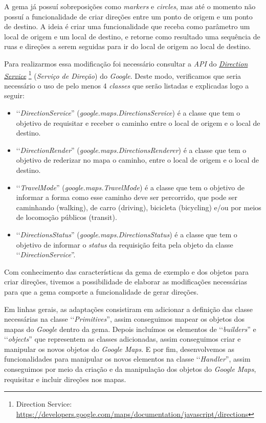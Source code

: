 A gema já possuí sobreposições como \emph{markers} e \emph{circles}, mas até o momento não possuí a
funcionalidade de criar direções entre um ponto de origem e um ponto de destino. A ideia é criar
uma funcionalidade que receba como parâmetro um local de origem e um local de destino, e retorne como
resultado uma sequência de ruas e direções a serem seguidas para ir do local de origem ao local de destino.

Para realizarmos essa modificação foi necessário consultar a \emph{API} do
\emph{\href{https://developers.google.com/maps/documentation/javascript/directions}{Direction Service}}
\footnote{Direction Service: \url{https://developers.google.com/maps/documentation/javascript/directions}}
(\emph{Serviço de Direção}) do \emph{Google}. Deste modo, verificamos que seria necessário o uso de pelo
menos 4 \emph{classes} que serão listadas e explicadas logo a seguir:

\begin{itemize}

 \item ‘‘\emph{DirectionService}'' (\emph{google.maps.DirectionsService}) é a classe que tem o
 objetivo de requisitar e receber o caminho entre o local de origem e o local de destino.

 \item ‘‘\emph{DirectionRender}'' (\emph{google.maps.DirectionsRenderer}) é a classe que tem o
 objetivo de rederizar no mapa o caminho, entre o local de origem e o local de destino.

 \item ‘‘\emph{TravelMode}'' (\emph{google.maps.TravelMode}) é a classe que tem o objetivo de
 informar a forma como esse caminho deve ser percorrido, que pode ser caminhando (walking), de carro
 (driving), bicicleta (bicycling) e/ou por meios de locomoção públicos (transit).

 \item ‘‘\emph{DirectionsStatus}'' (\emph{google.maps.DirectionsStatus}) é a classe que tem o
 objetivo de informar o \emph{status} da requisição feita pela objeto da classe
 ‘‘\emph{DirectionService}''.

\end{itemize}

Com conhecimento das características da gema de exemplo e dos objetos para criar direções, tivemos a
possibilidade de elaborar as modificações necessárias para que a gema comporte a funcionalidade de
gerar direções.

Em linhas gerais, as adaptações consistiram em adicionar a definição das classe
necessárias na classe ‘‘\emph{Primitives}'', assim conseguimos mapear os objetos dos mapas do
\emph{Google} dentro da gema. Depois incluímos os elementos de ‘‘\emph{builders}'' e ‘‘\emph{objects}''
que representem as classes adicionadas, assim conseguimos criar e manipular os novos objetos do
\emph{Google Maps}. E por fim, desenvolvemos as funcionalidades para manipular os novos elementos
na classe ‘‘\emph{Handler}'', assim conseguimos por meio da criação e da manipulação dos objetos do
\emph{Google Maps}, requisitar e incluir direções nos mapas.

